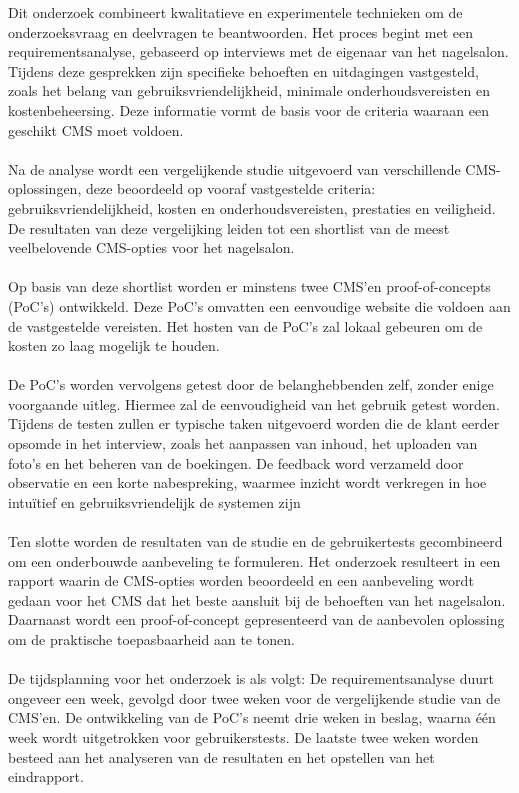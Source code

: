 \noindent
Dit onderzoek combineert kwalitatieve en experimentele technieken om de onderzoeksvraag en deelvragen te beantwoorden. Het proces begint met een requirementsanalyse, gebaseerd op interviews met de eigenaar van het nagelsalon. Tijdens deze gesprekken zijn specifieke behoeften en uitdagingen vastgesteld, zoals het belang van gebruiksvriendelijkheid, minimale onderhoudsvereisten en kostenbeheersing. Deze informatie vormt de basis voor de criteria waaraan een geschikt CMS moet voldoen.
\\ \\
Na de analyse wordt een vergelijkende studie uitgevoerd van verschillende CMS-oplossingen, deze beoordeeld op vooraf vastgestelde criteria: gebruiksvriendelijkheid, kosten en onderhoudsvereisten, prestaties en veiligheid. De resultaten van deze vergelijking leiden tot een shortlist van de meest veelbelovende CMS-opties voor het nagelsalon.
\\ \\
Op basis van deze shortlist worden er minstens twee CMS’en proof-of-concepts (PoC’s) ontwikkeld. Deze PoC's omvatten een eenvoudige website die voldoen aan de vastgestelde vereisten. Het hosten van de PoC's zal lokaal gebeuren om de kosten zo laag mogelijk te houden.
\\ \\
De PoC's worden vervolgens getest door de belanghebbenden zelf, zonder enige voorgaande uitleg. Hiermee zal de eenvoudigheid van het gebruik getest worden. Tijdens de testen zullen er typische taken uitgevoerd worden die de klant eerder opsomde in het interview, zoals het aanpassen van inhoud, het uploaden van foto’s en het beheren van de boekingen. De feedback word verzameld door observatie en een korte nabespreking, waarmee inzicht wordt verkregen in hoe intuïtief en gebruiksvriendelijk de systemen zijn
\\ \\
Ten slotte worden de resultaten van de studie en de gebruikertests gecombineerd om een onderbouwde aanbeveling te formuleren. Het onderzoek resulteert in een rapport waarin de CMS-opties worden beoordeeld en een aanbeveling wordt gedaan voor het CMS dat het beste aansluit bij de behoeften van het nagelsalon. Daarnaast wordt een proof-of-concept gepresenteerd van de aanbevolen oplossing om de praktische toepasbaarheid aan te tonen.
\\ \\
De tijdsplanning voor het onderzoek is als volgt:
De requirementsanalyse duurt ongeveer een week, gevolgd door twee weken voor de vergelijkende studie van de CMS’en. De ontwikkeling van de PoC’s neemt drie weken in beslag, waarna één week wordt uitgetrokken voor gebruikerstests. De laatste twee weken worden besteed aan het analyseren van de resultaten en het opstellen van het eindrapport.


